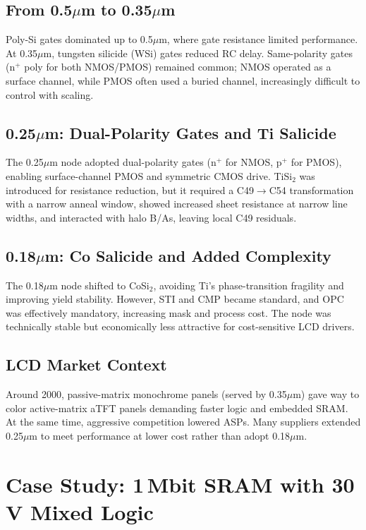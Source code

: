 \documentclass[conference]{IEEEtran}
\begin{document}
\subsection{From 0.5$\mu$m to 0.35$\mu$m}
Poly-Si gates dominated up to 0.5$\mu$m, where gate resistance limited performance. At 0.35$\mu$m, tungsten silicide (WSi) gates reduced RC delay. Same-polarity gates (n$^+$ poly for both NMOS/PMOS) remained common; NMOS operated as a surface channel, while PMOS often used a buried channel, increasingly difficult to control with scaling.

\subsection{0.25$\mu$m: Dual-Polarity Gates and Ti Salicide}
The 0.25$\mu$m node adopted dual-polarity gates (n$^+$ for NMOS, p$^+$ for PMOS), enabling surface-channel PMOS and symmetric CMOS drive. TiSi$_2$ was introduced for resistance reduction, but it required a C49$\rightarrow$C54 transformation with a narrow anneal window, showed increased sheet resistance at narrow line widths, and interacted with halo B/As, leaving local C49 residuals.

\subsection{0.18$\mu$m: Co Salicide and Added Complexity}
The 0.18$\mu$m node shifted to CoSi$_2$, avoiding Ti's phase-transition fragility and improving yield stability. However, STI and CMP became standard, and OPC was effectively mandatory, increasing mask and process cost. The node was technically stable but economically less attractive for cost-sensitive LCD drivers.

\subsection{LCD Market Context}
Around 2000, passive-matrix monochrome panels (served by 0.35$\mu$m) gave way to color active-matrix aTFT panels demanding faster logic and embedded SRAM. At the same time, aggressive competition lowered ASPs. Many suppliers extended 0.25$\mu$m to meet performance at lower cost rather than adopt 0.18$\mu$m.

\section{Case Study: 1\,Mbit SRAM with 30\,V Mixed Logic}
\end{document}
